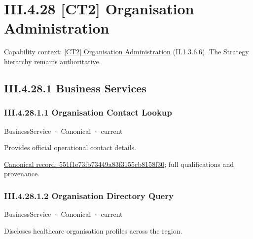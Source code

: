 \section*{III.4.28 [CT2] Organisation Administration}
\label{navigation:III.4.28}

{\small Capability context: \hyperref[element:14fbdc5ce3dd4c2092c5397dab3ed743]{[CT2] Organisation Administration} (II.1.3.6.6). The Strategy hierarchy remains authoritative.}\par
\subsection*{III.4.28.1 Business Services}
\label{navigation:III.4.28.1}

\subsubsection*{III.4.28.1.1 Organisation Contact Lookup}
\label{navigation:III.4.28.1.1}

\label{element:551f1e73fb73449a83f3155cb8158f30}
{\small BusinessService · Canonical · current}\par

Provides official operational contact details.


{\footnotesize \href{../../../../continuum/business/business-service/551f1e73fb73449a83f3155cb8158f30.md}{Canonical record: 551f1e73fb73449a83f3155cb8158f30}; full qualifications and provenance.}\par
\subsubsection*{III.4.28.1.2 Organisation Directory Query}
\label{navigation:III.4.28.1.2}

\label{element:c5acf1dc97874d0a8264f9a5c1b735fa}
{\small BusinessService · Canonical · current}\par

Discloses healthcare organisation profiles across the region.


